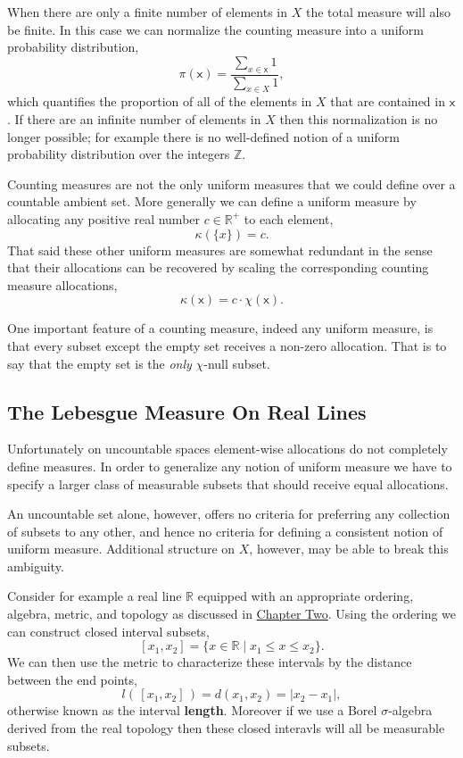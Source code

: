 \documentclass[
  letterpaper,
  DIV=11,
  numbers=noendperiod]{scrartcl}
\begin{document}
When there are only a finite number of elements in \(X\) the total
measure will also be finite. In this case we can normalize the counting
measure into a uniform probability distribution, \[
\pi ( \mathsf{x} ) =
\frac{ \sum_{x \in \mathsf{x}} 1 }{ \sum_{x \in X} 1 },
\] which quantifies the proportion of all of the elements in \(X\) that
are contained in \(\mathsf{x}\). If there are an infinite number of
elements in \(X\) then this normalization is no longer possible; for
example there is no well-defined notion of a uniform probability
distribution over the integers \(\mathbb{Z}\).

Counting measures are not the only uniform measures that we could define
over a countable ambient set. More generally we can define a uniform
measure by allocating any positive real number \(c \in \mathbb{R}^{+}\)
to each element, \[
\kappa(\{ x \}) = c.
\] That said these other uniform measures are somewhat redundant in the
sense that their allocations can be recovered by scaling the
corresponding counting measure allocations, \[
\kappa ( \mathsf{x} ) = c \cdot \chi ( \mathsf{x} ).
\]

One important feature of a counting measure, indeed any uniform measure,
is that every subset except the empty set receives a non-zero
allocation. That is to say that the empty set is the \emph{only}
\(\chi\)-null subset.

\hypertarget{sec:lebesgue}{%
\subsection{The Lebesgue Measure On Real Lines}\label{sec:lebesgue}}

Unfortunately on uncountable spaces element-wise allocations do not
completely define measures. In order to generalize any notion of uniform
measure we have to specify a larger class of measurable subsets that
should receive equal allocations.

An uncountable set alone, however, offers no criteria for preferring any
collection of subsets to any other, and hence no criteria for defining a
consistent notion of uniform measure. Additional structure on \(X\),
however, may be able to break this ambiguity.

Consider for example a real line \(\mathbb{R}\) equipped with an
appropriate ordering, algebra, metric, and topology as discussed in
\href{https://betanalpha.github.io/assets/chapters_html/spaces.html}{Chapter
Two}. Using the ordering we can construct closed interval subsets, \[
[ x_{1}, x_{2} ] = \{ x \in \mathbb{R} \mid x_{1} \le x \le x_{2} \}.
\] We can then use the metric to characterize these intervals by the
distance between the end points, \[
l( \, [ x_{1}, x_{2} ] \, ) = d( x_{1}, x_{2} ) = | x_{2} - x_{1} |,
\] otherwise known as the interval \textbf{length}. Moreover if we use a
Borel \(\sigma\)-algebra derived from the real topology then these
closed interavls will all be measurable subsets.
\end{document}
